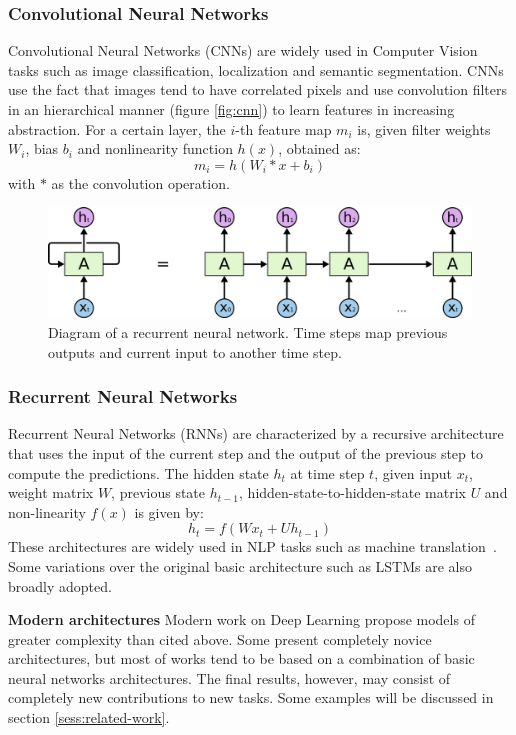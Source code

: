 \documentclass[12pt]{article}
\begin{document}
\subsubsection{Convolutional Neural Networks}
Convolutional Neural Networks (CNNs) are widely used in Computer Vision
tasks such as image classification, localization and semantic segmentation.
CNNs use the fact that images tend to have correlated pixels and use
convolution filters in an hierarchical manner (figure \ref{fig:cnn})
to learn features in increasing abstraction.
For a certain layer, the $i$-th feature map $m_i$ is,
given filter weights $W_i$, bias $b_i$ and nonlinearity function $h(x)$,
obtained as:
$$m_i = h\left(W_i * x + b_i\right)$$
with $*$ as the convolution operation.

\begin{figure}
\begin{center}
    \includegraphics[width=0.9\linewidth]{./img/rnn2.png}
\caption{
    Diagram of a recurrent neural network.
    Time steps map previous outputs and current input to another time step.
}
\label{fig:rnn}
\end{center}
\end{figure}

\subsubsection{Recurrent Neural Networks}
Recurrent Neural Networks (RNNs) are characterized by a recursive architecture
that uses the input of the current step and the output of the previous
step to compute the predictions.
The hidden state $h_t$ at time step $t$, given input $x_t$, weight matrix $W$,
previous state $h_{t-1}$, hidden-state-to-hidden-state matrix $U$ and
non-linearity $f(x)$ is given by:
$$h_t = f\left(Wx_t + Uh_{t-1}\right)$$
These architectures are widely used in NLP tasks such as
machine translation~\cite{ref:rnn-nlp}.
Some variations over the original basic architecture such as
LSTMs are also broadly adopted.

\textbf{Modern architectures}
Modern work on Deep Learning propose models of greater complexity than cited above.
Some present completely novice architectures, but most of works tend to be
based on a combination of basic neural networks architectures. The final results, however, may consist
of completely new contributions to new tasks.
Some examples will be discussed in section \ref{sess:related-work}.
\end{document}
